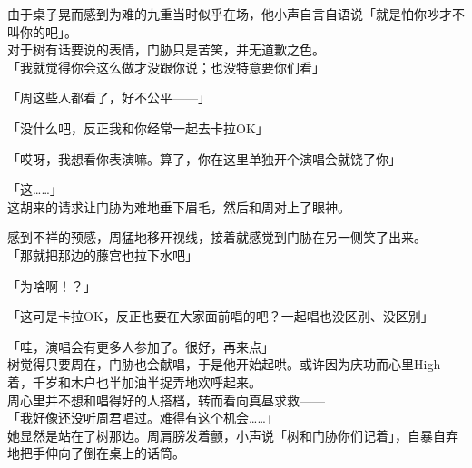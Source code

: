 由于桌子晃而感到为难的九重当时似乎在场，他小声自言自语说「就是怕你吵才不叫你的吧」。\\

对于树有话要说的表情，门胁只是苦笑，并无道歉之色。\\

「我就觉得你会这么做才没跟你说；也没特意要你们看」

「周这些人都看了，好不公平——」

「没什么吧，反正我和你经常一起去卡拉OK」

「哎呀，我想看你表演嘛。算了，你在这里单独开个演唱会就饶了你」

「这……」\\

这胡来的请求让门胁为难地垂下眉毛，然后和周对上了眼神。

感到不祥的预感，周猛地移开视线，接着就感觉到门胁在另一侧笑了出来。\\

「那就把那边的藤宫也拉下水吧」

「为啥啊！？」

「这可是卡拉OK，反正也要在大家面前唱的吧？一起唱也没区别、没区别」

「哇，演唱会有更多人参加了。很好，再来点」\\

树觉得只要周在，门胁也会献唱，于是他开始起哄。或许因为庆功而心里High着，千岁和木户也半加油半捉弄地欢呼起来。\\

周心里并不想和唱得好的人搭档，转而看向真昼求救——\\

「我好像还没听周君唱过。难得有这个机会……」\\

她显然是站在了树那边。周肩膀发着颤，小声说「树和门胁你们记着」，自暴自弃地把手伸向了倒在桌上的话筒。
